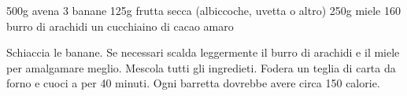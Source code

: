 \vegetarian
\freeze
\begin{ingreds}
	500g avena
	3 banane
	125g frutta secca (albiccoche, uvetta o altro)
	250g miele
	160 burro di arachidi
	un cucchiaino di cacao amaro

\end{ingreds}

\begin{method}
	Schiaccia le banane. Se necessari scalda leggermente il burro di arachidi e il miele per amalgamare meglio. Mescola tutti gli ingredieti. Fodera un teglia di carta da forno e cuoci a  per 40 minuti. Ogni barretta dovrebbe avere circa 150 calorie.
\end{method}



